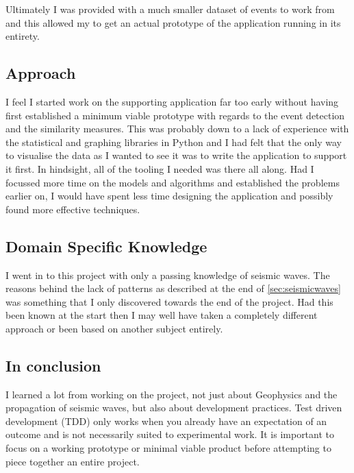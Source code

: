 \documentclass[../report.tex]{subfiles}
\begin{document}
	Ultimately I was provided with a much smaller dataset of events to work from and this allowed my to get an actual 
	prototype of the application running in its entirety.
	
\subsection{Approach}

	I feel I started work on the supporting application far too early without having first established a minimum viable prototype with regards to the event detection and the similarity measures.  This was probably down to a lack of experience with the statistical and graphing libraries in Python and I had felt that the only way to visualise the data as I wanted to see it was to write the application to support it first.  In hindsight, all of the tooling I needed was there all along.  Had I focussed more time on the models and algorithms and established the problems earlier on, I would have spent less time designing the application and possibly found more effective techniques.
	
\subsection{Domain Specific Knowledge}

	I went in to this project with only a passing knowledge of seismic waves.  The reasons behind the lack of patterns as described at the end of \cref{sec:seismicwaves} was something that I only discovered towards the end of the project.  Had this been known at the start then I may well have taken a completely different approach or been based on another subject entirely.
	
\subsection{In conclusion}

	I learned a lot from working on the project, not just about Geophysics and the propagation of seismic waves, but also about development practices.  Test driven development (TDD) only works when you already have an expectation of an outcome and is not necessarily suited to experimental work.  It is important to focus on a working prototype or minimal viable product before attempting to piece together an entire project.
	
\end{document}
